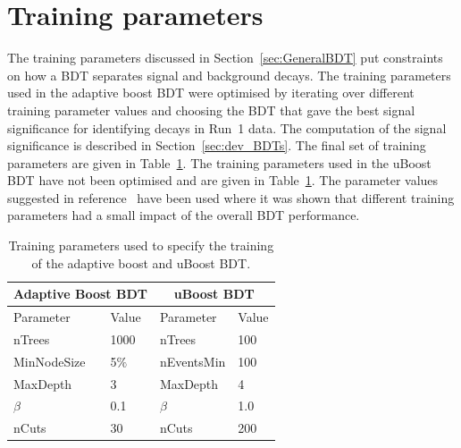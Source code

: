 \section{Training parameters}
The training parameters discussed in Section~\ref{sec:GeneralBDT} put constraints on how a BDT separates signal and background decays. 
The training parameters used in the adaptive boost BDT were optimised by iterating over different training parameter values and choosing the BDT that gave the best signal significance for identifying \bhh decays in Run~1 data. The computation of the signal significance is described in Section~\ref{sec:dev_BDTs}. %
The final set of training parameters are given in Table~\ref{tab:ELtrainingparamss}. %
The training parameters used in the uBoost BDT have not been optimised and are given in Table~\ref{tab:ELtrainingparamss}. The parameter values suggested in reference~\cite{Stevens:2013dya} have been used where it was shown that different training parameters had a small impact of the overall BDT performance. %
\begin{table}[htbp]
\begin{center}
\begin{tabular}{llll}
\toprule \toprule
\multicolumn{2}{c}{Adaptive Boost BDT} & \multicolumn{2}{c}{uBoost BDT} \\ \midrule
Parameter & Value & Parameter & Value\\ \midrule
nTrees & 1000 &  nTrees & 100\\
MinNodeSize & 5$\%$ & nEventsMin & 100 \\
MaxDepth & 3 & MaxDepth & 4 \\
$\beta$ & 0.1 & $\beta$ & 1.0 \\
nCuts & 30 & nCuts & 200 \\
\bottomrule \bottomrule
\end{tabular}
\vspace{0.7cm}
\caption{Training parameters used to specify the training of the adaptive boost and uBoost BDT.}
\label{tab:ELtrainingparamss}
\end{center}
\vspace{-1.0cm}
\end{table}


